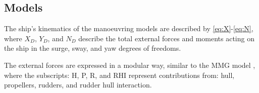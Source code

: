 \subsection{Models}
\label{sec:models}
The ship's kinematics of the manoeuvring models are described by \autoref{eq:X}-\autoref{eq:N}, where $X_D$, $Y_D$, and $N_D$ describe the total external forces and moments acting on the ship in the surge, sway, and yaw degrees of freedoms.
\begin{equation}
    \label{eq:X}
    
\end{equation}
%
\begin{equation}
    \label{eq:Y}
    
\end{equation}
%
\begin{equation}
    \label{eq:N}
    
\end{equation}

The external forces are expressed in a modular way, similar to the MMG model \citep{yasukawa_introduction_2015},
\begin{equation}
    \label{eq:X_D}
    
\end{equation}
%
\begin{equation}
    \label{eq:Y_D}
    
\end{equation}
%
\begin{equation}
    \label{eq:N_D}
    
\end{equation}
where the subscripts: H, P, R, and RHI represent contributions from: hull, propellers, rudders, and rudder hull interaction.

